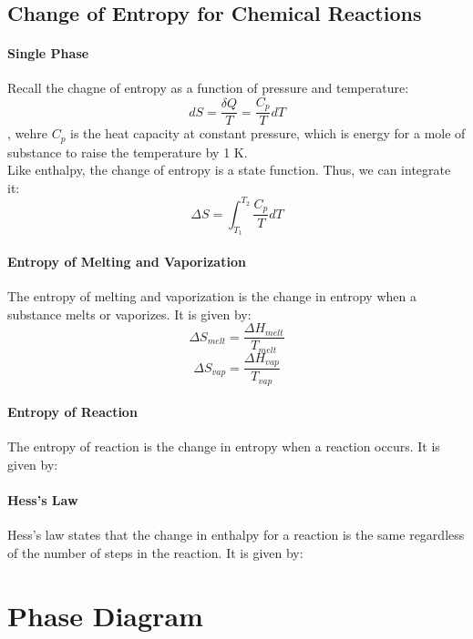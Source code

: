 \documentclass[11pt]{article}
\begin{document}
\begin{Gibb's Energy}
\begin{example}
\begin{align*}
    \end{align*}
\end{example}
\subsection{Change of Entropy for Chemical Reactions}
\paragraph{Single Phase} Recall the chagne of entropy as a function of pressure and temperature:
\begin{equation}
    dS = \frac{\delta Q}{T} = \frac{C_p}{T}dT
\end{equation}
, wehre $C_p$ is the heat capacity at constant pressure, which is energy for a mole of substance to raise the temperature by 1 K.\\
Like enthalpy, the change of entropy is a state function. Thus, we can integrate it:
\begin{equation}
    \Delta S = \int_{T_1}^{T_2} \frac{C_p}{T}dT
\end{equation}
\paragraph{Entropy of Melting and Vaporization} The entropy of melting and vaporization is the change in entropy when a substance melts or vaporizes. It is given by:
\begin{equation}
    \Delta S_{melt} = \frac{\Delta H_{melt}}{T_{melt}}
\end{equation}
\begin{equation}
    \Delta S_{vap} = \frac{\Delta H_{vap}}{T_{vap}}
\end{equation}
\paragraph{Entropy of Reaction} The entropy of reaction is the change in entropy when a reaction occurs. It is given by:    
\paragraph{Hess's Law} Hess's law states that the change in enthalpy for a reaction is the same regardless of the number of steps in the reaction. It is given by:
\section{Phase Diagram}

\end{Gibb's Energy}
\end{document}
